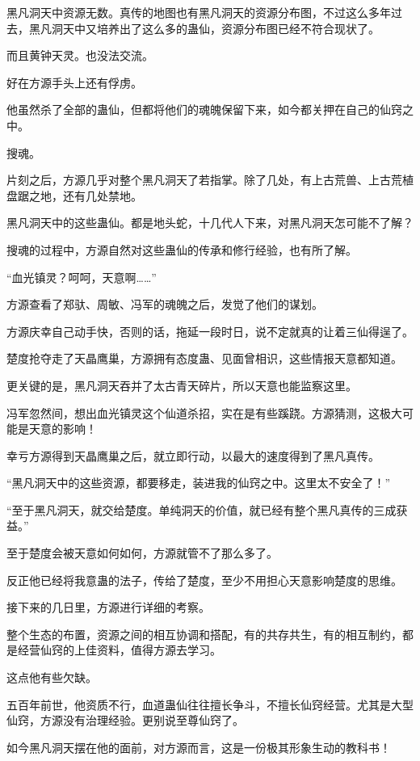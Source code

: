 \begin{this_body}
黑凡洞天中资源无数。真传的地图也有黑凡洞天的资源分布图，不过这么多年过去，黑凡洞天中又培养出了这么多的蛊仙，资源分布图已经不符合现状了。

而且黄钟天灵。也没法交流。

好在方源手头上还有俘虏。

他虽然杀了全部的蛊仙，但都将他们的魂魄保留下来，如今都关押在自己的仙窍之中。

搜魂。

片刻之后，方源几乎对整个黑凡洞天了若指掌。除了几处，有上古荒兽、上古荒植盘踞之地，还有几处禁地。

黑凡洞天中的这些蛊仙。都是地头蛇，十几代人下来，对黑凡洞天怎可能不了解？

搜魂的过程中，方源自然对这些蛊仙的传承和修行经验，也有所了解。

“血光镇灵？呵呵，天意啊……”

方源查看了郑驮、周敏、冯军的魂魄之后，发觉了他们的谋划。

方源庆幸自己动手快，否则的话，拖延一段时日，说不定就真的让着三仙得逞了。

楚度抢夺走了天晶鹰巢，方源拥有态度蛊、见面曾相识，这些情报天意都知道。

更关键的是，黑凡洞天吞并了太古青天碎片，所以天意也能监察这里。

冯军忽然间，想出血光镇灵这个仙道杀招，实在是有些蹊跷。方源猜测，这极大可能是天意的影响！

幸亏方源得到天晶鹰巢之后，就立即行动，以最大的速度得到了黑凡真传。

“黑凡洞天中的这些资源，都要移走，装进我的仙窍之中。这里太不安全了！”

“至于黑凡洞天，就交给楚度。单纯洞天的价值，就已经有整个黑凡真传的三成获益。”

至于楚度会被天意如何如何，方源就管不了那么多了。

反正他已经将我意蛊的法子，传给了楚度，至少不用担心天意影响楚度的思维。

接下来的几日里，方源进行详细的考察。

整个生态的布置，资源之间的相互协调和搭配，有的共存共生，有的相互制约，都是经营仙窍的上佳资料，值得方源去学习。

这点他有些欠缺。

五百年前世，他资质不行，血道蛊仙往往擅长争斗，不擅长仙窍经营。尤其是大型仙窍，方源没有治理经验。更别说至尊仙窍了。

如今黑凡洞天摆在他的面前，对方源而言，这是一份极其形象生动的教科书！

\end{this_body}


